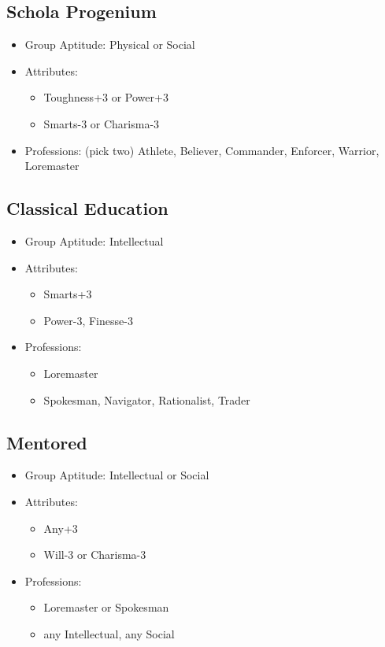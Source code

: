 \subsection{Schola Progenium}
\begin{itemize}
	\item Group Aptitude: Physical or Social
	\item Attributes:
	\begin{itemize}
		\item Toughness+3 or Power+3
		\item Smarts-3 or Charisma-3
	\end{itemize}
	\item Professions: (pick two) Athlete, Believer, Commander, Enforcer, Warrior, Loremaster
\end{itemize}

\subsection{Classical Education}
\begin{itemize}
	\item Group Aptitude: Intellectual
	\item Attributes:
	\begin{itemize}
		\item Smarts+3
		\item Power-3, Finesse-3
	\end{itemize}
	\item Professions:
	\begin{itemize}
		\item Loremaster
		\item Spokesman, Navigator, Rationalist, Trader
	\end{itemize}
\end{itemize}

\subsection{Mentored}
\begin{itemize}
	\item Group Aptitude: Intellectual or Social
	\item Attributes:
	\begin{itemize}
		\item Any+3
		\item Will-3 or Charisma-3
	\end{itemize}
	\item Professions:
	\begin{itemize}
		\item Loremaster or Spokesman
		\item any Intellectual, any Social
	\end{itemize}
\end{itemize}

